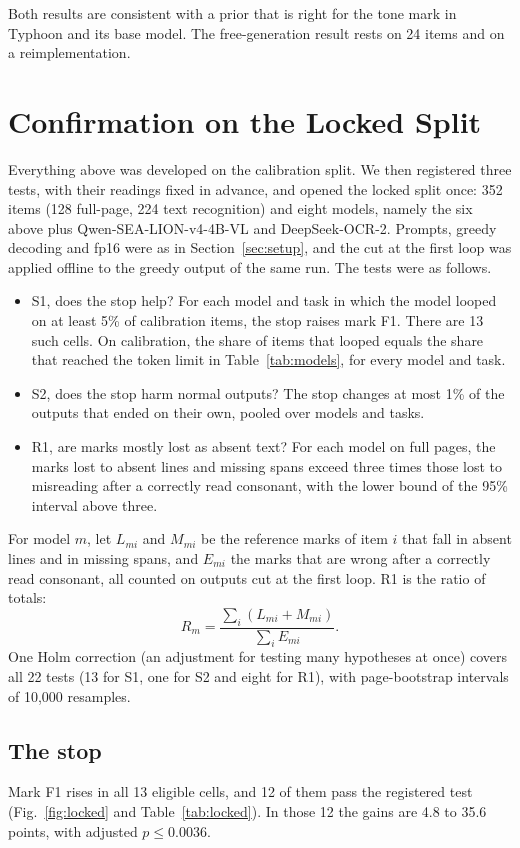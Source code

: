 Both results are consistent with a prior that is right for the tone mark in Typhoon and its base model. The free-generation result rests on 24 items and on a reimplementation.

\section{Confirmation on the Locked Split}\label{sec:locked}
Everything above was developed on the calibration split. We then registered three tests, with their readings fixed in advance, and opened the locked split once: 352 items (128 full-page, 224 text recognition) and eight models, namely the six above plus Qwen-SEA-LION-v4-4B-VL and DeepSeek-OCR-2. Prompts, greedy decoding and fp16 were as in Section~\ref{sec:setup}, and the cut at the first loop was applied offline to the greedy output of the same run. The tests were as follows.
\begin{itemize}
\item S1, does the stop help? For each model and task in which the model looped on at least 5\% of calibration items, the stop raises mark F1. There are 13 such cells. On calibration, the share of items that looped equals the share that reached the token limit in Table~\ref{tab:models}, for every model and task.
\item S2, does the stop harm normal outputs? The stop changes at most 1\% of the outputs that ended on their own, pooled over models and tasks.
\item R1, are marks mostly lost as absent text? For each model on full pages, the marks lost to absent lines and missing spans exceed three times those lost to misreading after a correctly read consonant, with the lower bound of the 95\% interval above three.
\end{itemize}
For model $m$, let $L_{mi}$ and $M_{mi}$ be the reference marks of item $i$ that fall in absent lines and in missing spans, and $E_{mi}$ the marks that are wrong after a correctly read consonant, all counted on outputs cut at the first loop. R1 is the ratio of totals:
\begin{equation}
R_m=\frac{\sum_i (L_{mi}+M_{mi})}{\sum_i E_{mi}}.
\end{equation}
One Holm correction (an adjustment for testing many hypotheses at once) covers all 22 tests (13 for S1, one for S2 and eight for R1), with page-bootstrap intervals of 10,000 resamples.

\subsection{The stop}
Mark F1 rises in all 13 eligible cells, and 12 of them pass the registered test (Fig.~\ref{fig:locked} and Table~\ref{tab:locked}). In those 12 the gains are 4.8 to 35.6 points, with adjusted $p\le0.0036$.


